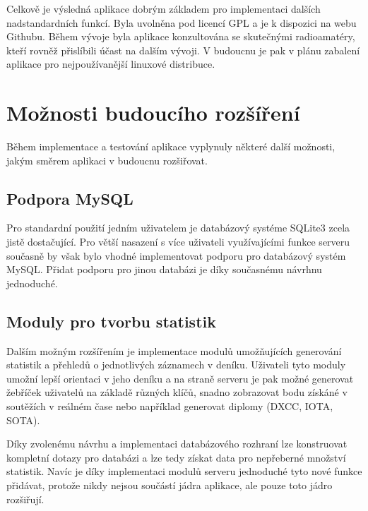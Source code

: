 Celkově je výsledná aplikace dobrým základem pro implementaci dalších nadstandardních funkcí. Byla uvolněna pod licencí
GPL a je k dispozici na webu Githubu. Během vývoje byla aplikace konzultována se skutečnými radioamatéry, kteří rovněž
přislíbili účast na dalším vývoji. V budoucnu je pak v plánu zabalení aplikace pro nejpoužívanější linuxové distribuce.


\section{Možnosti budoucího rozšíření}

Během implementace a testování aplikace vyplynuly některé další možnosti, jakým směrem aplikaci v budoucnu rozšiřovat.

\subsection{Podpora MySQL}

Pro standardní použití jedním uživatelem je databázový systéme SQLite3 zcela jistě dostačující.
Pro větší nasazení s více uživateli využívajícími funkce serveru současně by však bylo vhodné implementovat podporu pro databázový
systém MySQL. Přidat podporu pro jinou databázi je díky současnému návrhnu jednoduché.

\subsection{Moduly pro tvorbu statistik}

Dalším možným rozšířením je implementace modulů umožňujících generování statistik a přehledů o jednotlivých záznamech v deníku.
Uživateli tyto moduly umožní lepší orientaci v jeho deníku a na straně serveru je pak možné generovat žebříček uživatelů na
základě různých klíčů, snadno zobrazovat bodu získáné v soutěžích v reálném čase nebo například generovat diplomy
(DXCC, IOTA, SOTA).

Díky zvolenému návrhu a implementaci databázového rozhraní lze konstruovat kompletní dotazy pro databázi a lze tedy získat
data pro nepřeberné množství statistik. Navíc je díky implementaci modulů serveru jednoduché tyto nové funkce přidávat,
protože nikdy nejsou součástí jádra aplikace, ale pouze toto jádro rozšiřují.


